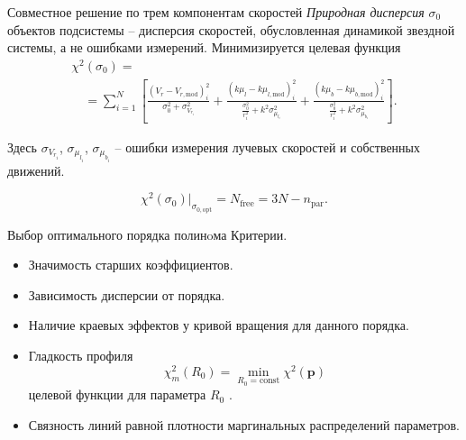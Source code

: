 \documentclass[compress]{beamer}
\begin{document}
\begin{frame}{Совместное решение по трем компонентам скоростей}
\textit{Природная дисперсия} $\sigma_0$ объектов подсистемы -- дисперсия скоростей, обусловленная динамикой звездной системы, а не ошибками измерений. Минимизируется целевая функция
\begin{multline} \label{chi_sq_func}
        \chi^2 (\sigma_0) = \\ 
                          \quad=\sum^N_{i = 1} \left[ \frac{\left( V_r - V_{r, \mathrm{mod}} \right)^2_i}{\sigma_0^2 + \sigma^2_{V_{r_i}}} + \frac{\left(k \mu_l - k\mu_{l, \mathrm{mod}} \right)^2_i}{\frac{\sigma_0^2}{r_i^2} + k^2\sigma^2_{\mu_{l_i}}} + \frac{\left(k \mu_b - k\mu_{b, \mathrm{mod}} \right)^2_i}{\frac{\sigma_0^2}{r_i^2} + k^2\sigma^2_{\mu_{b_i}}} \right].
\end{multline}

\par Здесь $\sigma_{V_{r_i}}$, $\sigma_{\mu_{l_i}}$, $\sigma_{\mu_{b_i}}$ -- ошибки измерения лучевых скоростей и собственных движений.

\begin{equation}
        \chi^2(\sigma_0) |_{\sigma_{0, \mathrm{opt}}} = N_{\mathrm{free}} = 3 N - n_{\mathrm{par}}.
\end{equation}
\end{frame}


\begin{frame}{Выбор оптимального порядка полинoма}
	Критерии.
	\begin{itemize}
		\item Значимость старших коэффициентов.
		\item Зависимость дисперсии от порядка.
		\item Наличие краевых эффектов у кривой вращения для данного порядка.
                \item Гладкость профиля 
                        \begin{equation}
                        \chi^2_m(R_0) = \min_{R_0 = \mathrm{const}} \chi^2(\textbf{p}) 
                        \end{equation}
                        целевой функции для параметра $R_0$ .
                \item Связность линий равной плотности маргинальных распределений параметров.
	\end{itemize}
\end{frame}
\end{document}
